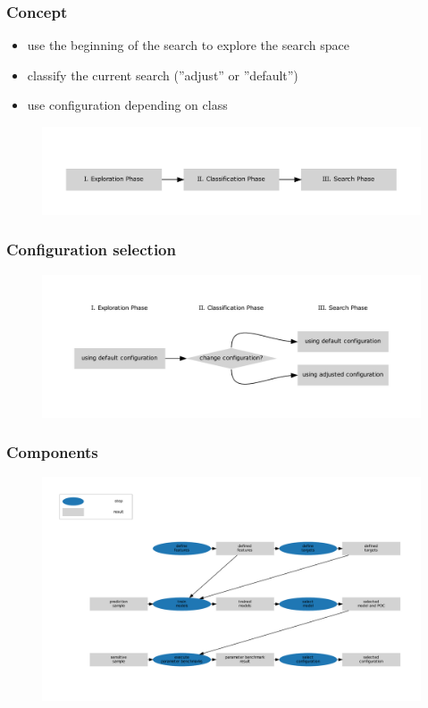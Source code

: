 \begin{frame}
	\frametitle{Concept}
	
	\begin{itemize}
		\item use the beginning of the search to explore the search space
		\item classify the current search (''adjust'' or ''default'')
		\item use configuration depending on class
	\end{itemize}
	\begin{figure}
		\includegraphics[width=1\textwidth]{figures/flowchart_phases}
	\end{figure}
	
\end{frame}

\begin{frame}
	\frametitle{Configuration selection}
	
	\begin{figure}
		\includegraphics[width=1\textwidth]{figures/flowchart_decision}
	\end{figure}
	
\end{frame}

\begin{frame}
	\frametitle{Components}
	
	\begin{figure}
		\includegraphics[width=1\textwidth]{figures/flowchart_component_search}
	\end{figure}
	
\end{frame}